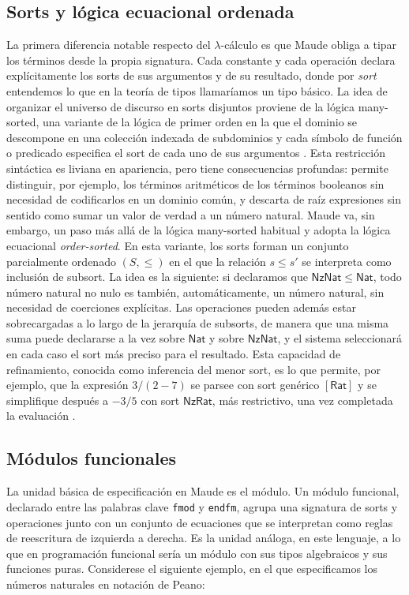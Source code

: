 \documentclass[a4paper,12pt]{report}
\theoremstyle{definition}
\theoremstyle{plain}
\theoremstyle{remark}
\begin{document}
\subsection{Sorts y l\'ogica ecuacional ordenada}
La primera diferencia notable respecto del $\lambda$-c\'alculo es que Maude obliga a tipar los t\'erminos desde la propia signatura. Cada constante y cada operaci\'on declara expl\'icitamente los sorts de sus argumentos y de su resultado, donde por \textit{sort} entendemos lo que en la teor\'ia de tipos llamar\'iamos un tipo b\'asico. La idea de organizar el universo de discurso en sorts disjuntos proviene de la l\'ogica many-sorted, una variante de la l\'ogica de primer orden en la que el dominio se descompone en una colecci\'on indexada de subdominios y cada s\'imbolo de funci\'on o predicado especifica el sort de cada uno de sus argumentos \citep{sep-logic-many-sorted}. Esta restricci\'on sint\'actica es liviana en apariencia, pero tiene consecuencias profundas: permite distinguir, por ejemplo, los t\'erminos aritm\'eticos de los t\'erminos booleanos sin necesidad de codificarlos en un dominio com\'un, y descarta de ra\'iz expresiones sin sentido como sumar un valor de verdad a un n\'umero natural.
\newline
\newline
Maude va, sin embargo, un paso m\'as all\'a de la l\'ogica many-sorted habitual y adopta la l\'ogica ecuacional \textit{order-sorted}. En esta variante, los sorts forman un conjunto parcialmente ordenado $(S, \leq)$ en el que la relaci\'on $s \leq s'$ se interpreta como inclusi\'on de subsort. La idea es la siguiente: si declaramos que $\mathsf{NzNat} \leq \mathsf{Nat}$, todo n\'umero natural no nulo es tambi\'en, autom\'aticamente, un n\'umero natural, sin necesidad de coerciones expl\'icitas. Las operaciones pueden adem\'as estar sobrecargadas a lo largo de la jerarqu\'ia de subsorts, de manera que una misma suma puede declararse a la vez sobre $\mathsf{Nat}$ y sobre $\mathsf{NzNat}$, y el sistema seleccionar\'a en cada caso el sort m\'as preciso para el resultado. Esta capacidad de refinamiento, conocida como inferencia del menor sort, es lo que permite, por ejemplo, que la expresi\'on $3/(2 - 7)$ se parsee con sort gen\'erico $[\mathsf{Rat}]$ y se simplifique despu\'es a $-3/5$ con sort $\mathsf{NzRat}$, m\'as restrictivo, una vez completada la evaluaci\'on \citep{clavel2007}.

\subsection{M\'odulos funcionales}
La unidad b\'asica de especificaci\'on en Maude es el m\'odulo. Un m\'odulo funcional, declarado entre las palabras clave \texttt{fmod} y \texttt{endfm}, agrupa una signatura de sorts y operaciones junto con un conjunto de ecuaciones que se interpretan como reglas de reescritura de izquierda a derecha. Es la unidad an\'aloga, en este lenguaje, a lo que en programaci\'on funcional ser\'ia un m\'odulo con sus tipos algebraicos y sus funciones puras. Considerese el siguiente ejemplo, en el que especificamos los n\'umeros naturales en notaci\'on de Peano:
\end{document}
